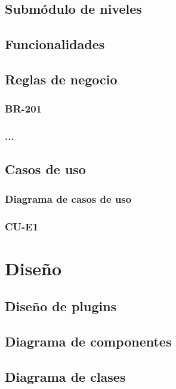 \section{Submódulo de niveles}

\section{Funcionalidades}

\section{Reglas de negocio}
\subsection{BR-201} %
\subsection{...}    %

\section{Casos de uso}
\subsection{Diagrama de casos de uso}
\subsection{CU-E1} %

\chapter{Diseño}
\section{Diseño de plugins}
\section{Diagrama de componentes}
\section{Diagrama de clases}

